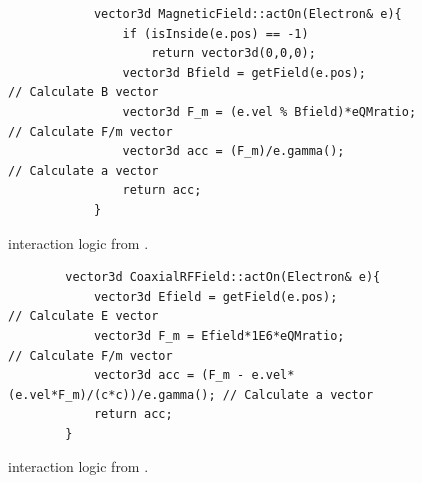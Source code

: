 \documentclass[a4paper,oneside,12pt]{report}
\numberwithin{equation}{chapter}
\begin{document}
{\begin{figure}[H]
    \begin{minipage}{\textwidth}
        \begin{verbatim}
            vector3d MagneticField::actOn(Electron& e){
                if (isInside(e.pos) == -1)
                    return vector3d(0,0,0);
                vector3d Bfield = getField(e.pos);                          // Calculate B vector
                vector3d F_m = (e.vel % Bfield)*eQMratio;                   // Calculate F/m vector
                vector3d acc = (F_m)/e.gamma();                             // Calculate a vector
                return acc;
            }
        \end{verbatim}
    \end{minipage}
    \vspace{20pt}
    \caption{\eEM  interaction logic from .}
    \label{fig:3D_e_EM_interaction_first}
\end{figure}\fi
\begin{figure}[H]
    \begin{verbatim}
        vector3d CoaxialRFField::actOn(Electron& e){
            vector3d Efield = getField(e.pos);                        // Calculate E vector
            vector3d F_m = Efield*1E6*eQMratio;                       // Calculate F/m vector
            vector3d acc = (F_m - e.vel*(e.vel*F_m)/(c*c))/e.gamma(); // Calculate a vector
            return acc;
        }
    \end{verbatim}
    \vspace{-3pt}
    \caption{\eE interaction logic from .}
    \label{fig:3D_e_E_interaction_first}
\end{figure}

}
\end{document}
